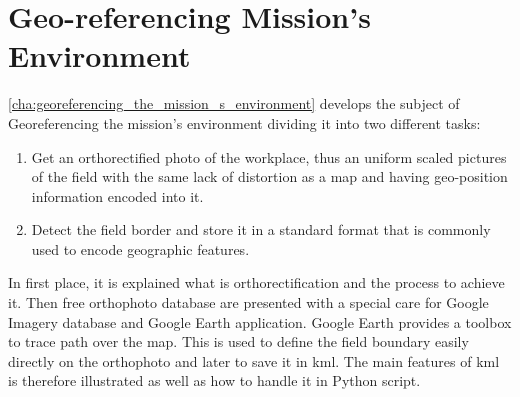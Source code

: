 \section{Geo-referencing Mission's Environment} %
\label{sec:geo_referencing_mission_s_environment}
\autoref{cha:georeferencing_the_mission_s_environment} develops the subject of Georeferencing the mission's environment dividing it into two different tasks: 
\begin{enumerate}
  \item Get an orthorectified photo of the workplace, thus an uniform scaled pictures of the field with the same lack of distortion as a map and having geo-position information encoded into it.
  \item Detect the field border and store it in a standard format that is commonly used to encode geographic features.
\end{enumerate}
In first place, it is explained what is orthorectification and the process to achieve it. Then free orthophoto database are presented with a special care for Google Imagery database and Google Earth application.
Google Earth provides a toolbox to trace path over the map. This is used to define the field boundary easily directly on the orthophoto and later to save it in \acrfull{kml}. The main features of \acrshort{kml} is therefore illustrated as well as how to handle it in Python script.





